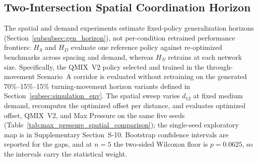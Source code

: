 \documentclass[review,12pt]{elsarticle}
\begin{document}
\subsection{Two-Intersection Spatial Coordination Horizon}
\label{subsec:spatial_horizon}
The spatial and demand experiments estimate fixed-policy generalization
horizons (Section~\ref{subsubsec:gen_horizon}), not per-condition retrained
performance frontiers: $H_S$ and $H_D$ evaluate one reference policy
against re-optimized benchmarks across spacing and demand, whereas $H_N$
retrains at each network size. Specifically, the QMIX~V2 policy selected
and trained in the through-movement Scenario~A corridor is evaluated
without retraining on the generated 70\%--15\%--15\% turning-movement
horizon variants defined in Section~\ref{subsec:simulation_env}. The spatial
sweep varies $d_{12}$ at fixed medium demand, recomputes the optimized
offset per distance, and evaluates optimized offset, QMIX~V2, and Max
Pressure on the same five seeds
(Table~\ref{tab:max_pressure_spatial_comparison}); the single-seed
exploratory map is in Supplementary Section~S-10. Bootstrap confidence
intervals are reported for the gaps, and at $n=5$ the two-sided Wilcoxon
floor is $p=0.0625$, so the intervals carry the statistical weight.
\end{document}
